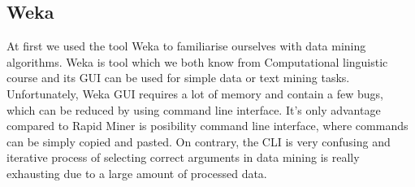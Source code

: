 \subsection{Weka} %
\label{sub:Weka}

At first we used the tool Weka to familiarise ourselves with data mining algorithms.
Weka is tool which we both know from Computational linguistic course and its GUI can be used for simple data or text mining tasks. Unfortunately, Weka GUI requires a lot of memory and contain a few bugs, which can be reduced by using command line interface.
It's only advantage compared to Rapid Miner is posibility command line interface, where commands can be simply copied and pasted.
On contrary, the CLI is very confusing and iterative process of selecting correct arguments in data mining is really exhausting due to a large amount of processed data.

